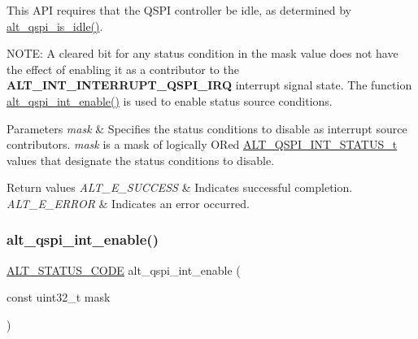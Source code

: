 This A\+PI requires that the Q\+S\+PI controller be idle, as determined by \mbox{\hyperlink{group__ALT__QSPI__CSR_gaeaa7e762d8b79b1989385c978174b7b8}{alt\+\_\+qspi\+\_\+is\+\_\+idle()}}.

N\+O\+TE\+: A cleared bit for any status condition in the mask value does not have the effect of enabling it as a contributor to the {\bfseries{A\+L\+T\+\_\+\+I\+N\+T\+\_\+\+I\+N\+T\+E\+R\+R\+U\+P\+T\+\_\+\+Q\+S\+P\+I\+\_\+\+I\+RQ}} interrupt signal state. The function \mbox{\hyperlink{group__ALT__QSPI__CSR_ga90573895220218be5c3be1888010e5bc}{alt\+\_\+qspi\+\_\+int\+\_\+enable()}} is used to enable status source conditions.


\begin{DoxyParams}{Parameters}
{\em mask} & Specifies the status conditions to disable as interrupt source contributors. {\itshape mask} is a mask of logically OR\textquotesingle{}ed \mbox{\hyperlink{group__ALT__QSPI__CSR_ga9630d0374a96983752d4053c122665dd}{A\+L\+T\+\_\+\+Q\+S\+P\+I\+\_\+\+I\+N\+T\+\_\+\+S\+T\+A\+T\+U\+S\+\_\+t}} values that designate the status conditions to disable.\\
\hline
\end{DoxyParams}

\begin{DoxyRetVals}{Return values}
{\em A\+L\+T\+\_\+\+E\+\_\+\+S\+U\+C\+C\+E\+SS} & Indicates successful completion. \\
\hline
{\em A\+L\+T\+\_\+\+E\+\_\+\+E\+R\+R\+OR} & Indicates an error occurred. \\
\hline
\end{DoxyRetVals}
\mbox{\label{group__ALT__QSPI__CSR_ga90573895220218be5c3be1888010e5bc}} 
\subsubsection{\texorpdfstring{alt\_qspi\_int\_enable()}{alt\_qspi\_int\_enable()}}
{\footnotesize\ttfamily \mbox{\hyperlink{hwlib_8h_abdb0d369f069723ca55d6c94bcaaaa12}{A\+L\+T\+\_\+\+S\+T\+A\+T\+U\+S\+\_\+\+C\+O\+DE}} alt\+\_\+qspi\+\_\+int\+\_\+enable (\begin{DoxyParamCaption}\item[{const uint32\+\_\+t}]{mask }\end{DoxyParamCaption})}

